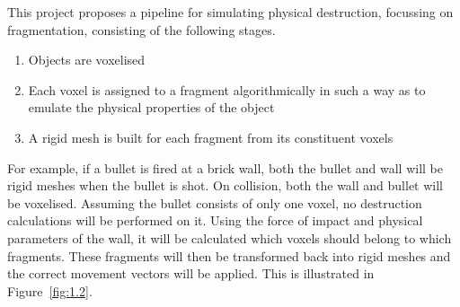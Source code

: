This project proposes a pipeline for simulating physical destruction, focussing on fragmentation, consisting of the following stages.
\begin{enumerate}
\item{Objects are voxelised}
\item{Each voxel is assigned to a fragment algorithmically in such a way as to emulate the physical properties of the object}
\item{A rigid mesh is built for each fragment from its constituent voxels}
\end{enumerate}

For example, if a bullet is fired at a brick wall, both the bullet and wall will be rigid meshes when the bullet is shot. On collision, both the wall and bullet will be voxelised. Assuming the bullet consists of only one voxel, no destruction calculations will be performed on it. Using the force of impact and physical parameters of the wall, it will be calculated which voxels should belong to which fragments. These fragments will then be transformed back into rigid meshes and the correct movement vectors will be applied. This is illustrated in Figure~\ref{fig:1.2}.

